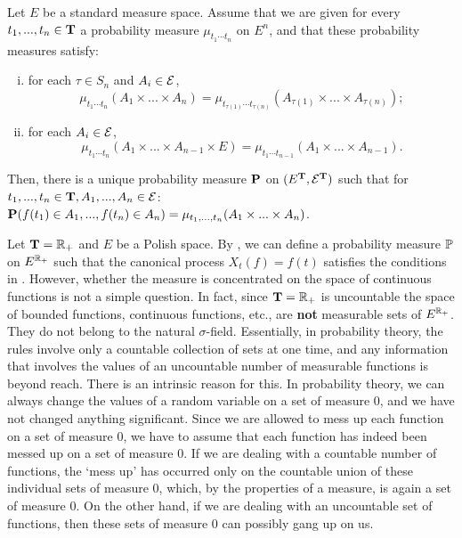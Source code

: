 \begin{theorem}\label{Thm:K1}
    Let $E$ be a standard measure space. Assume that we are given for every $t_1,...,t_n\in {\mathbf T}$ a probability measure  $\mu_{t_1\cdots t_n}$ on $E^n$, and that these probability measures satisfy:
	\begin{enumerate}[(i)]
		\item for each $\tau\in S_n$ and $A_i \in {\mathcal E}$, 
		$$
			\mu_{t_1\cdots t_n} (A_1 \times ... \times A_n)=\mu_{t_{\tau(1)}\cdots t_{\tau(n)}} (A_{\tau(1)} \times ... \times A_{\tau(n)});
		$$
		\item for each $A_i \in {\mathcal E}$, 
		$$
			\mu_{t_1\cdots t_n} (A_1 \times ... \times A_{n-1} \times E)=\mu_{t_1\cdots t_{n-1}} (A_1 \times ... \times A_{n-1}). 
		$$
	\end{enumerate}
    Then, there is a unique probability measure ${\mathbf P}$ on $(E^{{\mathbf T}}, {\mathcal E}^{{\mathbf T}})$ such that for $t_1,...,t_n \in {\mathbf T}, A_1,...,A_n \in {\mathcal E}$: ${\mathbf P} (f(t_1) \in A_1,...,f(t_n) \in A_n)=\mu_{t_1,...,t_n}(A_1 \times ... \times A_n)$. 
\end{theorem}
	
	
Let \({\mathbf T}={\mathbb R}_+\) and \(E\) be a Polish space. By , we can define a probability measure ${\mathbb P}$ on $E^{{\mathbb R}_+}$ such that the canonical process $X_t(f)=f(t)$ satisfies the conditions in . However, whether the measure is concentrated on the space of continuous functions is not a simple question. In fact, since ${\mathbf T}={\mathbb R}_+$ is uncountable the space of bounded functions, continuous functions, etc., are \textbf{not} measurable sets of $E^{{\mathbb R}_+}$. They do not belong to the natural $\sigma$-field. Essentially, in probability theory, the rules involve only a countable collection of sets at one time, and any information that involves the values of an uncountable number of measurable functions is beyond reach. There is an intrinsic reason for this. In probability theory, we can always change the values of a random variable on a set of measure $0$, and we have not changed anything significant. Since we are allowed to mess up each function on a set of measure $0$, we have to assume that each function has indeed been messed up on a set of measure 0. If we are dealing with a countable number of functions, the `mess up' has occurred only on the countable union of these individual sets of measure $0$, which, by the properties of a measure, is again a set of measure $0$. On the other hand, if we are dealing with an uncountable set of functions, then these sets of measure $0$ can possibly gang up on us.
	
